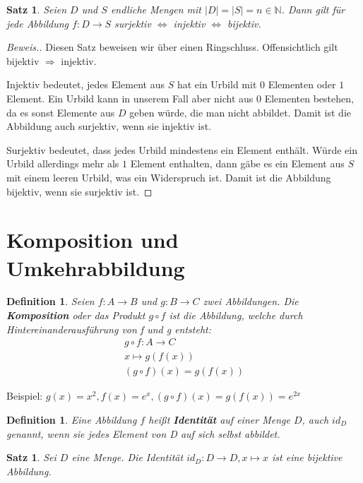 \documentclass{article}
\newtheorem{satz}[lemma]{Satz}
\newtheorem{definition}[lemma]{Definition}
\newenvironment{beweis}{\begin{proof}[Beweis.]}{\end{proof}}
\numberwithin{lemma}{section}
\newcommand{\pa}{\par \vspace{2mm} }
\begin{document}
\begin{satz}
Seien $D$ und $S$ endliche Mengen mit $|D|=|S|=n\in\mathbb{N}$. Dann gilt für jede Abbildung $f: D \to S$  
surjektiv $\Leftrightarrow$ injektiv $\Leftrightarrow$ bijektiv.
\end{satz}

\begin{beweis}
Diesen Satz beweisen wir über einen Ringschluss. Offensichtlich gilt bijektiv $\Rightarrow$ injektiv. \pa
Injektiv bedeutet, jedes Element aus $S$ hat ein Urbild mit $0$ Elementen oder $1$ Element. Ein Urbild kann in unserem Fall aber nicht aus $0$ Elementen bestehen, da es sonst Elemente aus $D$ geben würde, die man nicht abbildet. Damit ist die Abbildung auch surjektiv, wenn sie injektiv ist. \pa
Surjektiv bedeutet, dass jedes Urbild mindestens ein Element enthält. Würde ein Urbild allerdings mehr als $1$ Element enthalten, dann gäbe es ein Element aus $S$ mit einem leeren Urbild, was ein Widerspruch ist. Damit ist die Abbildung bijektiv, wenn sie surjektiv ist.
\end{beweis}

\section{Komposition und Umkehrabbildung}

\begin{definition}
Seien $f: A \to B$ und $g: B \to C$ zwei Abbildungen. Die \textbf{Komposition} oder das Produkt $g \circ f$ ist die Abbildung, welche durch Hintereinanderausführung von f und g entsteht:
\begin{align*}
	g \circ f: A \to C \\
	x \mapsto g(f(x))\\
	(g \circ f)(x) = g(f(x))
\end{align*} \par
\end{definition}

Beispiel: $g(x) = x^2, f(x) = e^x, (g \circ f)(x) = g(f(x)) = e^{2x}$

\begin{definition}
Eine Abbildung $f$ heißt \textbf{Identität} auf einer Menge $D$, auch $id_D$ genannt, wenn sie jedes Element von D auf sich selbst abbildet. 
\end{definition}

\begin{satz}
Sei $D$ eine Menge. Die Identität $id_D: D \to D, x \mapsto x$ ist eine bijektive Abbildung.
\end{satz}
\end{document}
